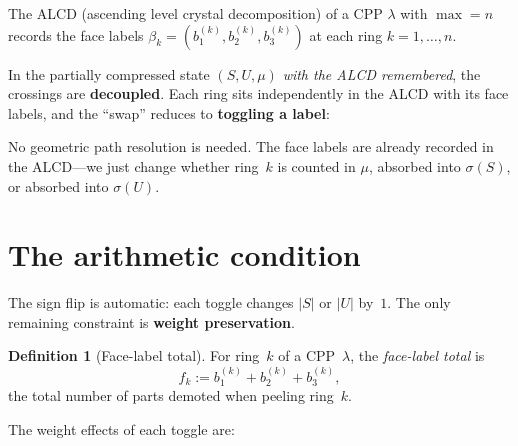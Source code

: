 \documentclass[11pt]{article}
\theoremstyle{plain}
\theoremstyle{definition}
\newtheorem{definition}[theorem]{Definition}
\begin{document}
The ALCD (ascending level crystal decomposition) of a CPP
$\lambda$ with $\max = n$ records the face labels
$\beta_k = (b_1^{(k)}, b_2^{(k)}, b_3^{(k)})$ at each
ring $k = 1, \ldots, n$.

In the partially compressed state $(S, U, \mu)$
\emph{with the ALCD remembered}, the crossings are
\textbf{decoupled}.  Each ring sits independently in the
ALCD with its face labels, and the ``swap'' reduces to
\textbf{toggling a label}:

\bigskip
\begin{center}
\end{center}

\bigskip\noindent
No geometric path resolution is needed.  The face labels
are already recorded in the ALCD---we just change whether
ring~$k$ is counted in $\mu$, absorbed into $\sigma(S)$,
or absorbed into $\sigma(U)$.


\section{The arithmetic condition}

The sign flip is automatic: each toggle changes $|S|$ or
$|U|$ by~$1$.  The only remaining constraint is
\textbf{weight preservation}.

\begin{definition}[Face-label total]
For ring~$k$ of a CPP~$\lambda$, the \emph{face-label total}
is
\[
  f_k := b_1^{(k)} + b_2^{(k)} + b_3^{(k)},
\]
the total number of parts demoted when peeling ring~$k$.
\end{definition}

The weight effects of each toggle are:
\end{document}
